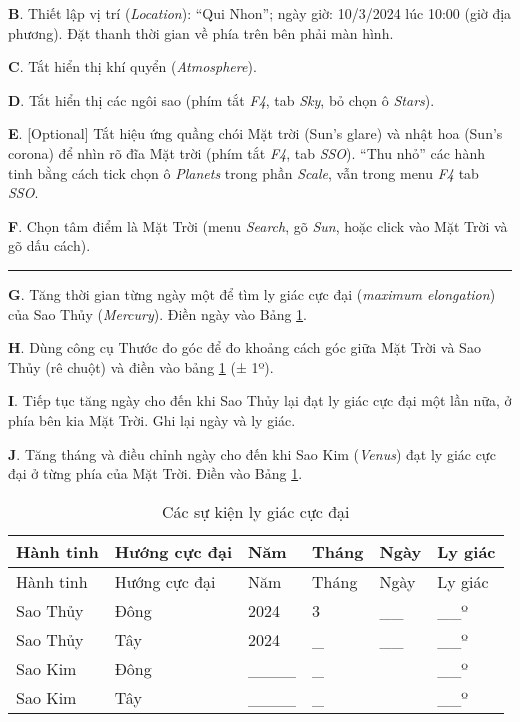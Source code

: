 \documentclass[
  a4paper,
]{book}
\begin{document}
\textbf{B}. Thiết lập vị trí (\emph{Location}): ``Qui Nhon''; ngày giờ: 10/3/2024 lúc 10:00 (giờ địa phương). Đặt thanh thời gian về phía trên bên phải màn hình.

\textbf{C}. Tắt hiển thị khí quyển (\emph{Atmosphere}).

\textbf{D}. Tắt hiển thị các ngôi sao (phím tắt \emph{F4}, tab \emph{Sky}, bỏ chọn ô \emph{Stars}).

\textbf{E}. {[}Optional{]} Tắt hiệu ứng quầng chói Mặt trời (Sun's glare) và nhật hoa (Sun's corona) để nhìn rõ đĩa Mặt trời (phím tắt \emph{F4}, tab \emph{SSO}). ``Thu nhỏ'' các hành tinh bằng cách tick chọn ô \emph{Planets} trong phần \emph{Scale}, vẫn trong menu \emph{F4} tab \emph{SSO}.

\textbf{F}. Chọn tâm điểm là Mặt Trời (menu \emph{Search}, gõ \emph{Sun}, hoặc click vào Mặt Trời và gõ dấu cách).

\begin{center}\rule{0.5\linewidth}{0.5pt}\end{center}

\textbf{G}. Tăng thời gian từng ngày một để tìm ly giác cực đại (\emph{maximum elongation}) của Sao Thủy (\emph{Mercury}). Điền ngày vào Bảng \ref{tab:elongation}.

\textbf{H}. Dùng công cụ Thước đo góc để đo khoảng cách góc giữa Mặt Trời và Sao Thủy (rê chuột) và điền vào bảng \ref{tab:elongation} (± 1º).

\textbf{I}. Tiếp tục tăng ngày cho đến khi Sao Thủy lại đạt ly giác cực đại một lần nữa, ở phía bên kia Mặt Trời. Ghi lại ngày và ly giác.

\textbf{J}. Tăng tháng và điều chỉnh ngày cho đến khi Sao Kim (\emph{Venus}) đạt ly giác cực đại ở từng phía của Mặt Trời. Điền vào Bảng \ref{tab:elongation}.

\begin{longtable}[]{@{}llllll@{}}
\caption{\label{tab:elongation} Các sự kiện ly giác cực đại}\tabularnewline
\toprule\noalign{}
Hành tinh & Hướng cực đại & Năm & Tháng & Ngày & Ly giác \\
\midrule\noalign{}
\endfirsthead
\toprule\noalign{}
Hành tinh & Hướng cực đại & Năm & Tháng & Ngày & Ly giác \\
\midrule\noalign{}
\endhead
\bottomrule\noalign{}
\endlastfoot
Sao Thủy & Đông & 2024 & 3 & \_\_ & \_\_º \\
Sao Thủy & Tây & 2024 & \_ & \_\_ & \_\_º \\
Sao Kim & Đông & \_\_\_\_ & \_ & & \_\_º \\
Sao Kim & Tây & \_\_\_\_ & \_ & & \_\_º \\
\end{longtable}
\end{document}
